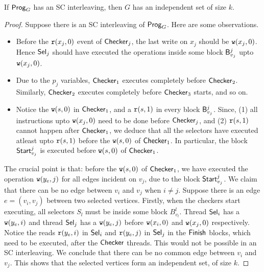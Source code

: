 \begin{lemma}\label{lem:sc-interleaving-to-independent-set}
If $\mathsf{Prog}_G$ has an SC interleaving, then $G$ has an independent set of size $k$.
\end{lemma}
\begin{proof} 

Suppose there is an SC interleaving of $\mathsf{Prog}_G$. Here are some observations.
\begin{itemize}
\item Before the $\mathtt{r}(x_j, 0)$ event of $\mathsf{Checker}_j$, the last write on $x_j$ should be $\mathtt{w}(x_j, 0)$. Hence $\mathsf{Sel}_j$ should have executed the operations inside some block $\mathsf{B}^j_{v_j}$ upto $\mathtt{w}(x_j, 0)$.  
\item Due to the $p_j$ variables, $\mathsf{Checker}_1$ executes completely before $\mathsf{Checker}_2$. Similarly, $\mathsf{Checker}_2$ executes completely before $\mathsf{Checker}_3$ starts, and so on.
\item Notice the $\mathtt{w}(s, 0)$ in $\mathsf{Checker}_1$, and a $\mathtt{r}(s, 1)$ in every block $\mathsf{B}^j_{v_j}$. Since, (1) all instructions upto $\mathtt{w}(x_j, 0)$ need to be done before $\mathsf{Checker}_j$, and (2) $\mathtt{r}(s, 1)$ cannot happen after $\mathsf{Checker}_1$, we deduce that all the selectors have executed atleast upto $\mathtt{r}(s, 1)$ before the $\mathtt{w}(s,0)$ of $\mathsf{Checker}_1$. In particular, the block $\mathsf{Start}^j_{v_j}$ is executed before $\mathtt{w}(s, 0)$ of $\mathsf{Checker}_1$.

\end{itemize} 
The crucial point is that: before the $\mathtt{w}(s,0)$ of $\mathsf{Checker}_1$, we have executed the operation $\mathtt{w}(y_e, j)$ for all edges incident on $v_j$, due to the block $\mathsf{Start}^j_{v_j}$. We claim that there can be no edge between $v_i$ and $v_j$ when $i \neq j$. Suppose there is an edge $e = (v_i, v_j)$ between two selected vertices. Firstly, when the checkers start executing, all selectors $S_l$ must be inside some block $B^l_{v_l}$. Thread $\mathsf{Sel}_i$ has a $\mathtt{w}(y_e, i)$ and thread $\mathsf{Sel}_j$ has a $\mathtt{w}(y_e, j)$ before $\mathtt{w}(x_i, 0)$ and $\mathtt{w}(x_j, 0)$ respectively. Notice the reads $\mathtt{r}(y_e, i)$ in $\mathsf{Sel}_i$ and $\mathtt{r}(y_e, j)$ in $\mathsf{Sel}_j$ in the $\mathsf{Finish}$ blocks,  which need to be executed, after the $\mathsf{Checker}$ threads. This would not be possible in an SC interleaving. We conclude that there can be no common edge between $v_i$ and $v_j$. This shows that the selected vertices form an independent set, of size $k$. 
\end{proof}

